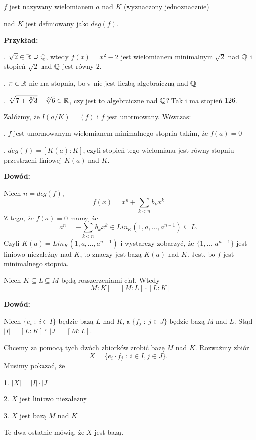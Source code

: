 \indent \point $f$ jest nazywany wielomianem  $a$ nad $K$ (wyznaczony jednoznacznie)

\indent \point {} nad $K$ jest definiowany jako $deg(f)$.
\medskip

\textbf{Przykład:}

. $\sqrt{2}\in\mathbb{R}\supseteq\mathbb{Q}$, wtedy $f(x)=x^2-2$ jest wielomianem minimalnym $\sqrt2$ nad $\mathbb{Q}$ i stopień $\sqrt{2}$ nad $\mathbb{Q}$ jest równy $2$.

. $\pi\in\mathbb{R}$ nie ma stopnia, bo $\pi$ nie jest liczbą algebraiczną nad $\mathbb{Q}$

. $\sqrt[7]{7+\sqrt[3]{3}}-\sqrt[6]{6}\in\mathbb{R}$, czy jest to algebraiczne nad $\mathbb{Q}$? Tak i ma stopień $126$.

\begin{uwaga}
    Załóżmy, że $I(a/K)=(f)$ i $f$ jest unormowany. Wówczas:

    . $f$ jest unormowanym wielomianem minimalnego stopnia takim, że $f(a)=0$

    . $deg(f)=[K(a):K]$, czyli stopień tego wielomianu jest równy stopniu przestrzeni liniowej $K(a)$ nad $K$.
\end{uwaga}

\textbf{Dowód:}

Niech $n=deg(f)$, 
$$f(x)=x^n+\sum\limits_{k<n}b_kx^k$$
Z tego, że $f(a)=0$ mamy, że 
$$a^n=-\sum\limits_{k<n}b_kx^k\in Lin_K(1,a,...,a^{n-1})\subseteq L.$$
Czyli $K(a)=Lin_K(1,a,...,a^{n-1})$ i wystarczy zobaczyć, że $\{1,..., a^{n-1}\}$ jest liniowo niezależny nad $K$, to znaczy jest bazą $K(a)$ nad $K$. Jest, bo $f$ jest minimalnego stopnia.

\begin{fakt}
    Niech $K\subseteq L\subseteq M$ będą rozszerzeniami ciał. Wtedy 
    $$[M:K]=[M:L]\cdot [L:K]$$
\end{fakt}

\textbf{Dowód:}

Niech $\{e_i\;:\;i\in I\}$ będzie bazą $L$ nad $K$, a $\{f_j\;:\;j\in J\}$ będzie bazą $M$ nad $L$. Stąd $|I|=[L:K]$ i $|J|=[M:L]$.

Chcemy za pomocą tych dwóch zbiorków zrobić bazę $M$ nad $K$. Rozważmy zbiór
$$X=\{e_i\cdot f_j\;:\;i\in I,j\in J\}.$$
Musimy pokazać, że 

1. $|X|=|I|\cdot|J|$

2. $X$ jest liniowo niezależny

3. $X$ jest bazą $M$ nad $K$

Te dwa ostatnie mówią, że $X$ jest bazą.

